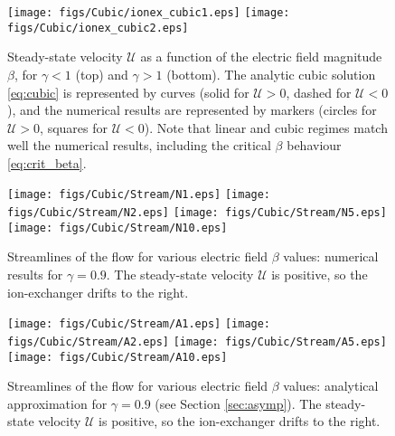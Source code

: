 \documentclass[MSc,beforeExam]{iitcsthesis}
\newcommand\cU{\mathscr{U}}
\begin{document}
\begin{figure}
    \begin{center}
    \texttt{[image: figs/Cubic/ionex\_cubic1.eps]}
    \texttt{[image: figs/Cubic/ionex\_cubic2.eps]}
        \caption[Ion exchanger steady-state velocity]{
        Steady-state velocity $\cU$ as a function of the 
        electric field magnitude $\beta$, for $\gamma < 1$ (top) and $\gamma > 1$ (bottom). 
        The analytic cubic solution \eqref{eq:cubic} is represented by curves
        (solid for $\cU > 0$, dashed for $\cU < 0$), 
        and the numerical results are represented by markers 
        (circles for $\cU > 0$, squares for $\cU < 0$). Note that linear and
        cubic regimes match well the numerical results, including the critical $\beta$ 
        behaviour \eqref{eq:crit_beta}. 
        }
	    \label{fig:IonExCubic}
    \end{center}
\end{figure}

\begin{figure}
    \begin{center}
	\texttt{[image: figs/Cubic/Stream/N1.eps]}
	\texttt{[image: figs/Cubic/Stream/N2.eps]}
	\texttt{[image: figs/Cubic/Stream/N5.eps]}
	\texttt{[image: figs/Cubic/Stream/N10.eps]}
        \caption[Ion exchanger streamlines -- numerical results]{
        Streamlines of the flow for various electric field $\beta$ values: 
        numerical results for $\gamma = 0.9$.  
        The steady-state velocity $\cU$ is positive, so the
        ion-exchanger drifts to the right. }
    \label{fig:Vortex1}
    \end{center}
\end{figure}

\begin{figure}
    \begin{center}
	\texttt{[image: figs/Cubic/Stream/A1.eps]}
	\texttt{[image: figs/Cubic/Stream/A2.eps]}
	\texttt{[image: figs/Cubic/Stream/A5.eps]}
	\texttt{[image: figs/Cubic/Stream/A10.eps]}
        \caption[Ion exchanger streamlines -- analytical results]{
        Streamlines of the flow for various electric field $\beta$ values: 
        analytical approximation for $\gamma = 0.9$ (see Section \ref{sec:asymp}).
        The steady-state velocity $\cU$ is positive, so the
        ion-exchanger drifts to the right.}
    \label{fig:Vortex2}
    \end{center}
\end{figure}
\end{document}
